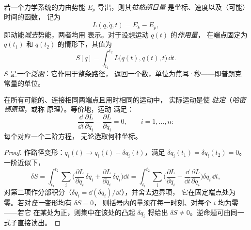 \begin{definition}[拉格朗日量与作用量]\label{def:b3:lagrangian-mechanics:action}
若一个力学系统的力由势能 $E_p$ 导出，则其\emph{拉格朗日量}
是坐标、速度以及（可能）时间的函数，
记为
\[
L(q, \dot q, t) = E_k - E_p ,
\]
即动能\emph{减去}势能，两者均用
表示。对于设想运动 $q(t)$ 的\emph{作用量}，
在端点固定为 $q(t_1)$ 和 $q(t_2)$ 的情形下，其值为
\[
S[q] = \int_{t_1}^{t_2} L\big(q(t), \dot q(t), t\big)\,\dd t .
\]
$S$ 是一个\emph{泛函}：它作用于整条路径，
返回一个数，单位为焦耳·秒——即普朗克常量的单位。
\end{definition}

\begin{theorem}\label{thm:b3:lagrangian-mechanics:euler-lagrange}
在所有可能的、连接相同两端点且用时相同的运动中，
实际运动是使
\emph{驻定}（\emph{哈密顿原理}，或称
\emph{}原理）。等价地，运动
满足\emph{}：
\[
\frac{\dd}{\dd t}\frac{\partial L}{\partial\dot q_i}
 - \frac{\partial L}{\partial q_i} = 0 ,
\qquad i = 1, \dots, n :
\]
每个对应一个二阶方程，
无论选取何种坐标。
\end{theorem}

\begin{proof}
作路径变形：$q_i(t) \to q_i(t) + \delta q_i(t)$，满足
$\delta q_i(t_1) = \delta q_i(t_2) = 0$。一阶近似下，
\[
\delta S = \int_{t_1}^{t_2}\sum_i\Big(
  \frac{\partial L}{\partial q_i}\,\delta q_i
 + \frac{\partial L}{\partial\dot q_i}\,\delta\dot q_i\Big)\dd t
 = \int_{t_1}^{t_2}\sum_i\Big(
  \frac{\partial L}{\partial q_i}
 - \frac{\dd}{\dd t}\frac{\partial L}{\partial\dot q_i}\Big)\delta q_i\,\dd t ,
\]
对第二项作分部积分（$\delta\dot q_i =
\dd(\delta q_i)/\dd t$），并舍去边界项，
它在固定端点处为零。若对\emph{任一}变形均有 $\delta S = 0$，
则括号内的量须在每一时刻、对每个 $i$ 均为零——若它
在某处为正，则集中在该处的凸起 $\delta q_i$ 将给出
$\delta S \neq 0$。逆命题可由同一式子直接读出。
\end{proof}

